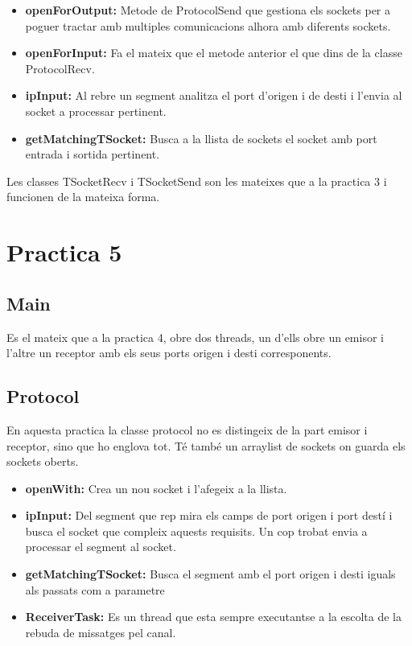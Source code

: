 \documentclass[12pt, a4papre]{article}
\begin{document}
	\begin{itemize}
		\item \textbf{openForOutput:} Metode de ProtocolSend que gestiona els sockets per a poguer tractar amb multiples comunicacions alhora amb diferents sockets.
		\item \textbf{openForInput:} Fa el mateix que el metode anterior el que dins de la classe ProtocolRecv.
		\item \textbf{ipInput:} Al rebre un segment analitza el port d'origen i de desti i l'envia al socket a processar pertinent.
		\item \textbf{getMatchingTSocket:} Busca a la llista de sockets el socket amb port entrada i sortida pertinent.
	\end{itemize}
	
	Les classes TSocketRecv i TSocketSend son les mateixes que a la practica 3 i funcionen de la mateixa forma.
	
	\section{Practica 5}
	
	\subsection{Main} 
	
	Es el mateix que a la practica 4, obre dos threads,  un d'ells obre un emisor i l'altre un receptor amb els seus ports origen i desti corresponents.
	
	\subsection{Protocol} 
	
	En aquesta practica la classe protocol no es distingeix de la part emisor i receptor, sino que ho englova tot. Té també un arraylist de sockets on guarda els sockets oberts.
	
	\begin{itemize}
		\item \textbf{openWith:} Crea un nou socket i l'afegeix a la llista.
		\item \textbf{ipInput:} Del segment que rep mira els camps de port origen i port destí i busca el socket que compleix aquests requisits. Un cop trobat envia a processar el segment al socket.
		\item \textbf{getMatchingTSocket:} Busca el segment amb el port origen i desti iguals als passats com a parametre
		\item \textbf{ReceiverTask:} Es un thread que esta sempre executantse a la escolta de la rebuda de missatges pel canal.
	\end{itemize}
	
\end{document}
